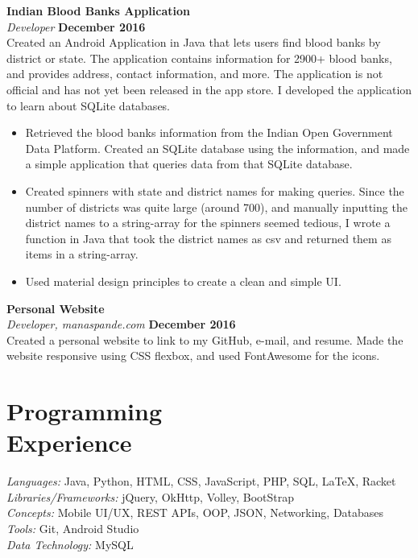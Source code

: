 \documentclass[margin,line]{resume}
\begin{document}
\begin{resume}
    \textbf{Indian Blood Banks Application}\vspace{2mm}\\\vspace{1mm}%
    \textsl{Developer} \hfill \textbf{December 2016}\\
    Created an Android Application in Java that lets users find blood banks by district or state. The application contains information for 2900+ blood banks, and provides address, contact information, and more. The application is not official and has not yet been released in the app store. I developed the application to learn about SQLite databases.

    \begin{itemize}
    \item Retrieved the blood banks information from the Indian Open Government Data Platform. Created an SQLite database using the information, and made a simple application that queries data from that SQLite database.
    \item Created spinners with state and district names for making queries. Since the number of districts was quite large (around 700), and manually inputting the district names to a string-array for the spinners seemed tedious, I wrote a function in Java that took the district names as csv and returned them as items in a string-array.
    \item Used material design principles to create a clean and simple UI.
    \end{itemize}

    \textbf{Personal Website}\vspace{2mm}\\\vspace{1mm}%
    \textsl{Developer, manaspande.com} \hfill \textbf{December 2016}\\
    Created a personal website to link to my GitHub, e-mail, and resume. Made the website responsive using CSS flexbox, and used FontAwesome for the icons.

    \section{\mysidestyle Programming\\Experience}

    \emph{Languages:} Java, Python, HTML, CSS, JavaScript, PHP, SQL, \LaTeX, Racket \\
    \emph{Libraries/Frameworks:} jQuery, OkHttp, Volley, BootStrap
    \\
    \emph{Concepts:} Mobile UI/UX, REST APIs, OOP, JSON, Networking, Databases
    \\
    \emph{Tools:} Git, Android Studio
    \\
    \emph{Data Technology:} MySQL
\vspace{-2mm}

\end{resume}
\end{document}
